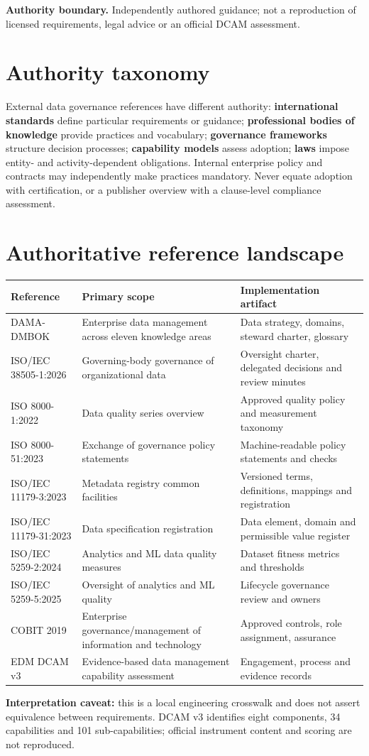 \documentclass[11pt,letterpaper]{article}
\begin{document}
\makedoctitle
\makedocsummary
\noindent\textbf{Authority boundary.} Independently authored guidance; not a reproduction of licensed requirements, legal advice or an official DCAM assessment.
\section{Authority taxonomy}
External data governance references have different authority: \textbf{international standards} define particular requirements or guidance; \textbf{professional bodies of knowledge} provide practices and vocabulary; \textbf{governance frameworks} structure decision processes; \textbf{capability models} assess adoption; \textbf{laws} impose entity- and activity-dependent obligations. Internal enterprise policy and contracts may independently make practices mandatory. Never equate adoption with certification, or a publisher overview with a clause-level compliance assessment.

\section{Authoritative reference landscape}
\begin{longtable}{p{.25\linewidth}p{.34\linewidth}p{.33\linewidth}}
\textbf{Reference} & \textbf{Primary scope} & \textbf{Implementation artifact}\\\hline
DAMA-DMBOK & Enterprise data management across eleven knowledge areas & Data strategy, domains, steward charter, glossary\\
ISO/IEC 38505-1:2026 & Governing-body governance of organizational data & Oversight charter, delegated decisions and review minutes\\
ISO 8000-1:2022 & Data quality series overview & Approved quality policy and measurement taxonomy\\
ISO 8000-51:2023 & Exchange of governance policy statements & Machine-readable policy statements and checks\\
ISO/IEC 11179-3:2023 & Metadata registry common facilities & Versioned terms, definitions, mappings and registration\\
ISO/IEC 11179-31:2023 & Data specification registration & Data element, domain and permissible value register\\
ISO/IEC 5259-2:2024 & Analytics and ML data quality measures & Dataset fitness metrics and thresholds\\
ISO/IEC 5259-5:2025 & Oversight of analytics and ML quality & Lifecycle governance review and owners\\
COBIT 2019 & Enterprise governance/management of information and technology & Approved controls, role assignment, assurance\\
EDM DCAM v3 & Evidence-based data management capability assessment & Engagement, process and evidence records\\
\end{longtable}
\textbf{Interpretation caveat:} this is a local engineering crosswalk and does not assert equivalence between requirements. DCAM v3 identifies eight components, 34 capabilities and 101 sub-capabilities; official instrument content and scoring are not reproduced.
\end{document}
